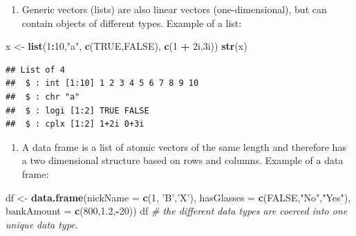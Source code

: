 \documentclass[12,]{article}
\newenvironment{Shaded}{\begin{snugshade}}{\end{snugshade}}
\newcommand{\KeywordTok}[1]{\textcolor[rgb]{0.13,0.29,0.53}{\textbf{#1}}}
\newcommand{\DataTypeTok}[1]{\textcolor[rgb]{0.13,0.29,0.53}{#1}}
\newcommand{\DecValTok}[1]{\textcolor[rgb]{0.00,0.00,0.81}{#1}}
\newcommand{\FloatTok}[1]{\textcolor[rgb]{0.00,0.00,0.81}{#1}}
\newcommand{\StringTok}[1]{\textcolor[rgb]{0.31,0.60,0.02}{#1}}
\newcommand{\CommentTok}[1]{\textcolor[rgb]{0.56,0.35,0.01}{\textit{#1}}}
\newcommand{\OtherTok}[1]{\textcolor[rgb]{0.56,0.35,0.01}{#1}}
\newcommand{\OperatorTok}[1]{\textcolor[rgb]{0.81,0.36,0.00}{\textbf{#1}}}
\newcommand{\NormalTok}[1]{#1}
\providecommand{\tightlist}{%
  \setlength{\itemsep}{0pt}\setlength{\parskip}{0pt}}
\begin{document}
\begin{enumerate}
\def\labelenumi{\arabic{enumi}.}
\setcounter{enumi}{1}
\tightlist
\item
  Generic vectors (lists) are also linear vectors (one-dimensional), but
  can contain objects of different types. Example of a list:
\end{enumerate}

\begin{Shaded}
\begin{Highlighting}[]
\NormalTok{x <-}\StringTok{ }\KeywordTok{list}\NormalTok{(}\DecValTok{1}\OperatorTok{:}\DecValTok{10}\NormalTok{,}\StringTok{"a"}\NormalTok{, }\KeywordTok{c}\NormalTok{(}\OtherTok{TRUE}\NormalTok{,}\OtherTok{FALSE}\NormalTok{), }\KeywordTok{c}\NormalTok{(}\DecValTok{1} \OperatorTok{+}\StringTok{ }\NormalTok{2i,3i))}
\KeywordTok{str}\NormalTok{(x)}
\end{Highlighting}
\end{Shaded}

\begin{verbatim}
## List of 4
##  $ : int [1:10] 1 2 3 4 5 6 7 8 9 10
##  $ : chr "a"
##  $ : logi [1:2] TRUE FALSE
##  $ : cplx [1:2] 1+2i 0+3i
\end{verbatim}

\begin{enumerate}
\def\labelenumi{\arabic{enumi}.}
\setcounter{enumi}{2}
\tightlist
\item
  A data frame is a list of atomic vectors of the same length and
  therefore has a two dimensional structure based on rows and columns.
  Example of a data frame:
\end{enumerate}

\begin{Shaded}
\begin{Highlighting}[]
\NormalTok{df <-}\StringTok{ }\KeywordTok{data.frame}\NormalTok{(}\DataTypeTok{nickName =} \KeywordTok{c}\NormalTok{(}\DecValTok{1}\NormalTok{, }\StringTok{'B'}\NormalTok{,}\StringTok{'X'}\NormalTok{), }
                 \DataTypeTok{hasGlasses =} \KeywordTok{c}\NormalTok{(}\OtherTok{FALSE}\NormalTok{,}\StringTok{"No"}\NormalTok{,}\StringTok{"Yes"}\NormalTok{),}
                 \DataTypeTok{bankAmount =} \KeywordTok{c}\NormalTok{(}\DecValTok{800}\NormalTok{,}\FloatTok{1.2}\NormalTok{,}\OperatorTok{-}\DecValTok{20}\NormalTok{))}
\NormalTok{df }\CommentTok{# the different data types are coerced into one unique data type.}
\end{Highlighting}
\end{Shaded}
\end{document}
